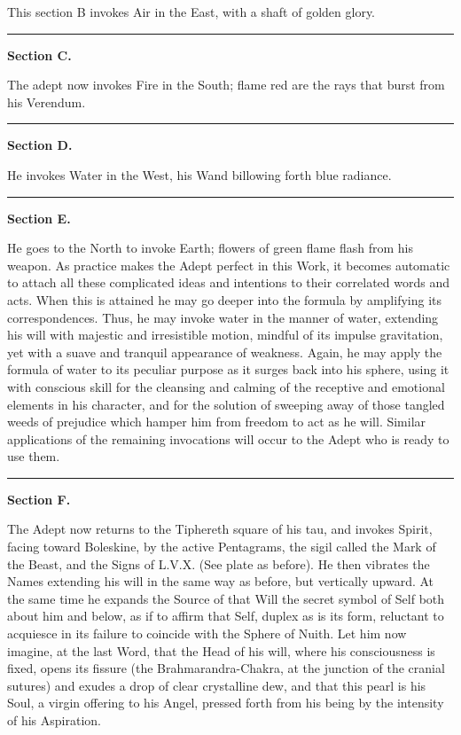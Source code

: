 This section B invokes Air in the East, with a shaft of golden glory.


{\centering
\rule{1in}{0.5pt}
\par}

\pagebreak[1]
\textbf{Section C.}


The adept now invokes Fire in the South; flame red are the rays that burst from his Verendum.


{\centering
\rule{1in}{0.5pt}
\par}

\pagebreak[1]
\textbf{Section D.}


He invokes Water in the West, his Wand billowing forth blue radiance.


{\centering
\rule{1in}{0.5pt}
\par}

\pagebreak[1]
\textbf{Section E.}


He goes to the North to invoke Earth; flowers of green flame flash from his weapon. As practice makes the Adept perfect in this Work, it becomes automatic to attach all these complicated ideas and intentions to their correlated words and acts. When this is attained he may go deeper into the formula by amplifying its correspondences. Thus, he may invoke water in the manner of water, extending his will with majestic and irresistible motion, mindful of its impulse gravitation, yet with a suave and tranquil appearance of weakness. Again, he may apply the formula of water to its peculiar purpose as it surges back into his sphere, using it with conscious skill for the cleansing and calming of the receptive and emotional elements in his character, and for the solution of sweeping away of those tangled weeds of prejudice which hamper him from freedom to act as he will. Similar applications of the remaining invocations will occur to the Adept who is ready to use them.


{\centering
\rule{1in}{0.5pt}
\par}

\pagebreak[1]
\textbf{Section F.}


The Adept now returns to the Tiphereth square of his tau, and invokes Spirit, facing toward Boleskine, by the active Pentagrams, the sigil called the Mark of the Beast, and the Signs of L.V.X. (See plate as before). He then vibrates the Names extending his will in the same way as before, but vertically upward. At the same time he expands the Source of that Will \textemdash{} the secret symbol of Self \textemdash{} both about him and below, as if to affirm that Self, duplex as is its form, reluctant to acquiesce in its failure to coincide with the Sphere of Nuith. Let him now imagine, at the last Word, that the Head of his will, where his consciousness is fixed, opens its fissure (the Brahmarandra-Chakra, at the junction of the cranial sutures) and exudes a drop of clear crystalline dew, and that this pearl is his Soul, a virgin offering to his Angel, pressed forth from his being by the intensity of his Aspiration.


